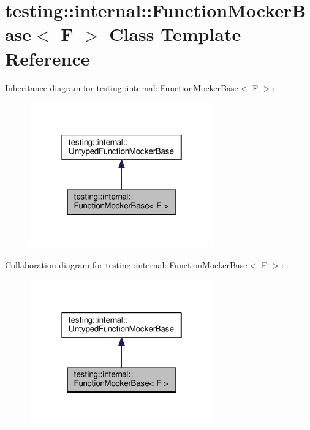 \hypertarget{classtesting_1_1internal_1_1FunctionMockerBase}{}\section{testing\+:\+:internal\+:\+:Function\+Mocker\+Base$<$ F $>$ Class Template Reference}
\label{classtesting_1_1internal_1_1FunctionMockerBase}


Inheritance diagram for testing\+:\+:internal\+:\+:Function\+Mocker\+Base$<$ F $>$\+:\nopagebreak
\begin{figure}[H]
\begin{center}
\leavevmode
\includegraphics[width=226pt]{classtesting_1_1internal_1_1FunctionMockerBase__inherit__graph}
\end{center}
\end{figure}


Collaboration diagram for testing\+:\+:internal\+:\+:Function\+Mocker\+Base$<$ F $>$\+:\nopagebreak
\begin{figure}[H]
\begin{center}
\leavevmode
\includegraphics[width=226pt]{classtesting_1_1internal_1_1FunctionMockerBase__coll__graph}
\end{center}
\end{figure}

